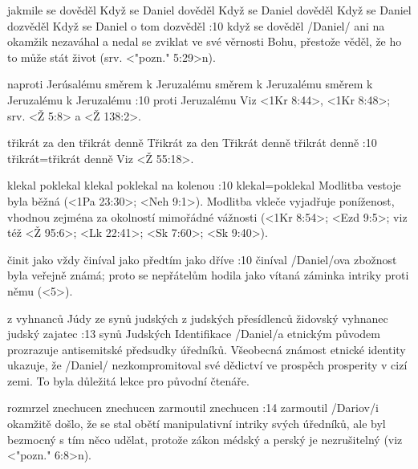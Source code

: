     {jakmile se dověděl}  %
    {Když se Daniel dověděl}  %
    {Když se Daniel dověděl}  %
    {Když se Daniel dozvěděl}  %
    {Když se Daniel o tom dozvěděl}  %
:10 {když se dověděl}  \x/Daniel/ ani na okamžik nezaváhal a nedal se zviklat ve své věrnosti Bohu, přestože věděl, že ho to může stát život (srv. <"pozn." 5:29>n). 

    {naproti Jerúsalému}  %
    {směrem k Jeruzalému}  %
    {směrem k Jeruzalému}  %
    {směrem k Jeruzalému}  %
    {k Jeruzalému}  %
:10 {proti Jeruzalému} Viz <1Kr 8:44>, <1Kr 8:48>; srv. <Ž 5:8> a <Ž 138:2>.       

    {třikrát za den} %
    {třikrát denně}  %
    {Třikrát za den} %
    {Třikrát denně}  %
    {třikrát denně}  %
:10 {třikrát}={třikrát denně} Viz <Ž 55:18>.     

 
    {klekal} %
    {poklekal}  %
    {klekal} %
    {poklekal}  %
    {na kolenou}  %
:10 {klekal}={poklekal} Modlitba vestoje byla běžná (<1Pa 23:30>; <Neh 9:1>).      
                               Modlitba vkleče vyjadřuje poníženost, vhodnou zejména za okolností mimořádné vážnosti 
                               (<1Kr 8:54>; <Ezd 9:5>; viz též <Ž 95:6>; <Lk 22:41>; <Sk 7:60>; <Sk 9:40>).  
                               
    {činit}  %
    {jako vždy}  %
    {činíval}  %
    {jako předtím}  %
    {jako dříve}  %
:10 {činíval} \x/Daniel/ova zbožnost byla veřejně známá; proto se nepřátelům hodila jako vítaná záminka intriky proti němu  (<5>).     

    {z vyhnanců Júdy}  %
    {ze synů judských}  %
    {z judských přesídlenců}  %
    {židovský vyhnanec}  %
    {judský zajatec}  %
:13 {synů Judských} Identifikace \x/Daniel/a etnickým původem prozrazuje antisemitské předsudky úředníků. Všeobecná známost etnické identity ukazuje, že \x/Daniel/ nezkompromitoval své dědictví ve prospěch prosperity v cizí zemi. To byla důležitá lekce pro původní čtenáře. 

    {rozmrzel}  %
    {znechucen}  %
    {znechucen}  %
    {zarmoutil}  %
    {znechucen}  %
:14 {zarmoutil} \x/Dariov/i okamžitě došlo, že se stal obětí manipulativní  intriky svých  úředníků, ale byl bezmocný s tím něco udělat, protože zákon médský a perský je nezrušitelný (viz <"pozn." 6:8>n).     

